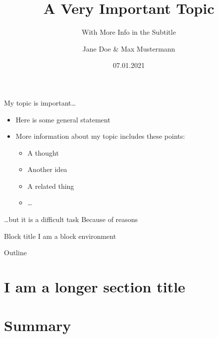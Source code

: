 \documentclass[aspectratio=169]{beamer}
\title{A Very Important Topic}
\subtitle{With More Info in the Subtitle}
\author{Jane Doe \& Max Mustermann}
\institute{Database Group\\University of Leipzig}
\date{07.01.2021}
\begin{document}
  
  
\maketitlepage
  
  
\begin{frame}{My topic is important\dots }
\begin{itemize}
  \item Here is some general statement 
  \item More information about my topic includes these points: 
    \begin{itemize}
      \item A thought
      \item Another idea
      \item A related thing 
      \item \dots
    \end{itemize}
\end{itemize}
\end{frame}


\begin{frame}{\dots but it is a difficult task}
  Because of reasons
  \begin{block}{Block title}
    I am a block environment 
  \end{block}
\end{frame}


\begin{frame}{Outline}
\tableofcontents[hideallsubsections]
\end{frame}


\section[A short section title]{I am a longer section title}

\begin{frame}

\end{frame}


\section{Summary}


\begin{frame}

\end{frame}

\begin{frame}

\end{frame}

\begin{frame}

\end{frame}

\begin{frame}

\end{frame}

\begin{frame}

\end{frame}
\end{document}
